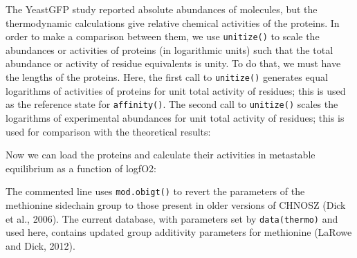 \documentclass[]{tufte-book}
\newenvironment{Shaded}{}{}
\newcommand{\KeywordTok}[1]{\textcolor[rgb]{0.00,0.44,0.13}{\textbf{#1}}}
\newcommand{\DecValTok}[1]{\textcolor[rgb]{0.25,0.63,0.44}{#1}}
\newcommand{\StringTok}[1]{\textcolor[rgb]{0.25,0.44,0.63}{#1}}
\newcommand{\OperatorTok}[1]{\textcolor[rgb]{0.40,0.40,0.40}{#1}}
\newcommand{\NormalTok}[1]{#1}
\begin{document}
\begin{Shaded}
\end{Shaded}

The YeastGFP study reported absolute abundances of molecules, but the
thermodynamic calculations give relative chemical activities of the
proteins. In order to make a comparison between them, we use
{\texttt{unitize()}} to scale the abundances or activities of proteins
(in logarithmic units) such that the total abundance or activity of
residue equivalents is unity. To do that, we must have the lengths of
the proteins. Here, the first call to {\texttt{unitize()}} generates
equal logarithms of activities of proteins for unit total activity of
residues; this is used as the reference state for {\texttt{affinity()}}.
The second call to {\texttt{unitize()}} scales the logarithms of
experimental abundances for unit total activity of residues; this is
used for comparison with the theoretical results:

\begin{Shaded}
\end{Shaded}

Now we can load the proteins and calculate their activities in
metastable equilibrium as a function of logfO2:

\begin{marginfigure}
The commented line uses {\texttt{mod.obigt()}} to revert the parameters
of the methionine sidechain group to those present in older versions of
CHNOSZ (Dick et al., 2006). The current database, with parameters set by
{\texttt{data(thermo)}} and used here, contains updated group additivity
parameters for methionine (LaRowe and Dick, 2012).
\end{marginfigure}
\end{document}
